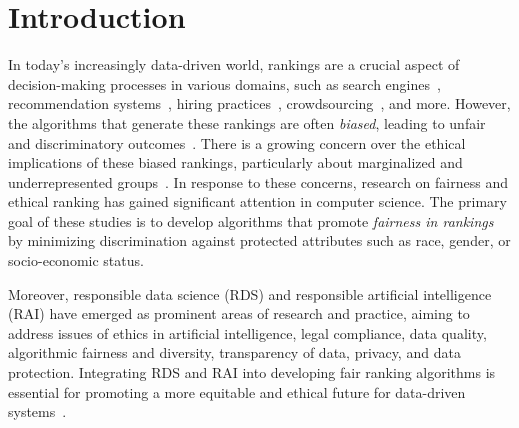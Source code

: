 \section{Introduction}

In today's increasingly data-driven world, rankings
are a crucial aspect of decision-making processes in various domains, such as search engines~\cite{mcdonald2021search}, recommendation systems~\cite{pitoura2022fairness,DBLP:conf/edbt/AzzaliniACDMA24}, hiring practices~\cite{balagopalan2023role,fabris2023fairness}, crowdsourcing~\cite{chen2019fairness,singh2018fairness,DBLP:conf/icde/CiceriFMT16}, and more. However, the algorithms that generate these rankings are often \emph{biased}, leading to unfair and discriminatory outcomes~\cite{zehlike2022fairness1,zehlike2022fairness2}.
There is a growing concern over the ethical implications of these biased rankings, particularly about marginalized and underrepresented groups~\cite{stoyanovich2020responsible}. In response to these concerns, research on fairness and ethical ranking has gained significant attention in computer science.
The primary goal of these studies is to develop algorithms that promote \emph{fairness in rankings} by minimizing discrimination against protected attributes such as race, gender, or socio-economic status.

Moreover, responsible data science (RDS) and responsible artificial intelligence (RAI) have emerged as prominent areas of research and practice, aiming to address issues of ethics in artificial intelligence, legal compliance, data quality, algorithmic fairness and diversity, transparency of data, privacy, and data protection. Integrating RDS and RAI into developing fair ranking algorithms is essential for promoting a more equitable and ethical future for data-driven systems~\cite{lewis2021teaching,stoyanovich2020responsible}.

